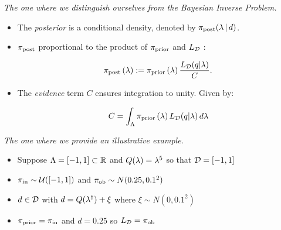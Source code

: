 \begin{frame}{\it The one where we distinguish ourselves from the Bayesian Inverse Problem.}

\begin{itemize}
	\item The \emph{posterior} is a conditional density, denoted by $\operatorname*{\pi_{post}}(\lambda\, | \, d)$.

	\bigskip
	\item $\operatorname*{\pi_{post}}$ proportional to the product of $\operatorname*{\pi_{prior}}$ and $L_{\mathcal{D}}$ \cite{Walpole, Berger, Complete, Smith}:

\begin{equation}\label{eq:sb_post}
    \operatorname*{\pi_{post}}\left ( \lambda \right ) := \operatorname*{\pi_{prior}}\left ( \lambda \right ) \frac{L_{\mathcal{D}} (q | \lambda)}{ C }.
\end{equation}

	\bigskip
	\item The \emph{evidence} term $C$ ensures integration to unity. Given by:

$$C = \int_{\Lambda} \operatorname*{\pi_{prior}}\left ( \lambda \right ) L_{\mathcal{D}}(q | \lambda) \, d\lambda$$

\end{itemize}

\end{frame}

\begin{frame}{\it The one where we provide an illustrative example.}

\begin{itemize}
\item Suppose ${\Lambda} = [-1,1]\subset\mathbb{R}$ and $Q(\lambda)=\lambda^5$ so that $\mathcal{D} = [-1,1]$

\bigskip
\item $\operatorname*{\pi_{in}}\sim \mathcal{U}([-1,1])$ and $\operatorname*{\pi_{ob}}\sim N(0.25,0.1^2)$

\bigskip
\item $d\in \mathcal{D}$ with $d=Q(\lambda^\dagger)+\xi$ where $\xi\sim N(0,0.1^2)$

\bigskip
\item $\operatorname*{\pi_{prior}} = \operatorname*{\pi_{in}}$ and $d=0.25$ so $L_{\mathcal{D}} = \operatorname*{\pi_{ob}}$
\end{itemize}

\end{frame}


